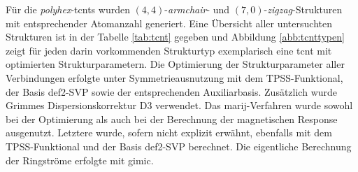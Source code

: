 Für die \textit{polyhex}-\acp{tcnt} wurden $(4,4)$-\textit{armchair}- und $(7,0)$-\textit{zigzag}-Strukturen mit entsprechender Atomanzahl generiert. Eine Übersicht aller untersuchten Strukturen ist in der Tabelle \ref{tab:tcnt} gegeben und Abbildung \ref{abb:tcnttypen} zeigt für jeden darin vorkommenden Strukturtyp exemplarisch eine \ac{tcnt} mit optimierten Strukturparametern. Die Optimierung der Strukturparameter aller Verbindungen erfolgte unter Symmetrieausnutzung mit dem TPSS-Funktional\supercite{tao2003climbing}, der Basis def2-SVP\supercite{weigend2005balanced} sowie der entsprechenden Auxiliarbasis\supercite{weigend2006accurate}. Zusätzlich wurde Grimmes Dispersionskorrektur D3\supercite{grimme2010consistent,grimme2011effect} verwendet. Das \ac{marij}-Verfahren wurde sowohl bei der Optimierung\supercite{sierka2003fast} als auch bei der Berechnung der magnetischen Response\supercite{reiter2017calculation} ausgenutzt. Letztere wurde, sofern nicht explizit erwähnt, ebenfalls mit dem TPSS-Funktional und der Basis def2-SVP berechnet. Die eigentliche Berechnung der Ringströme erfolgte mit \ac{gimic}.\supercite{juselius2004calculation,taubert2011calculation,fliegl2011gauge,sundholm2016calculations}

